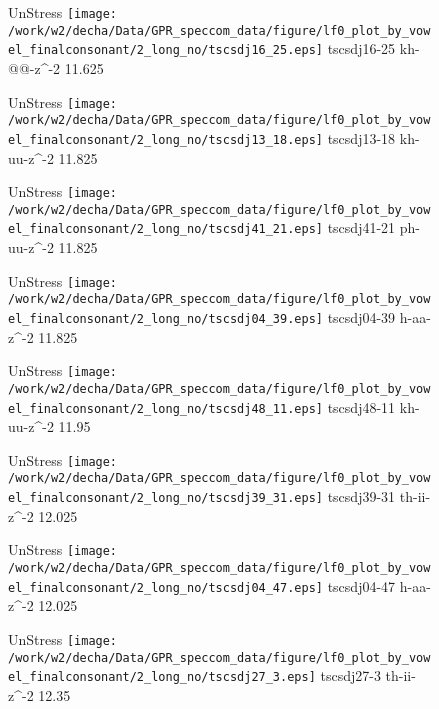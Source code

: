\documentclass{article}
\begin{document}
\begin{figure}[t]
\begin{minipage}[b]{.24\textwidth}
UnStress
\centering
\texttt{[image: /work/w2/decha/Data/GPR\_speccom\_data/figure/lf0\_plot\_by\_vowel\_finalconsonant/2\_long\_no/tscsdj16\_25.eps]}
tscsdj16-25 kh-@@-z\textasciicircum-2 11.625
\end{minipage}
\begin{minipage}[b]{.24\textwidth}
UnStress
\centering
\texttt{[image: /work/w2/decha/Data/GPR\_speccom\_data/figure/lf0\_plot\_by\_vowel\_finalconsonant/2\_long\_no/tscsdj13\_18.eps]}
tscsdj13-18 kh-uu-z\textasciicircum-2 11.825
\end{minipage}
\begin{minipage}[b]{.24\textwidth}
UnStress
\centering
\texttt{[image: /work/w2/decha/Data/GPR\_speccom\_data/figure/lf0\_plot\_by\_vowel\_finalconsonant/2\_long\_no/tscsdj41\_21.eps]}
tscsdj41-21 ph-uu-z\textasciicircum-2 11.825
\end{minipage}
\begin{minipage}[b]{.24\textwidth}
UnStress
\centering
\texttt{[image: /work/w2/decha/Data/GPR\_speccom\_data/figure/lf0\_plot\_by\_vowel\_finalconsonant/2\_long\_no/tscsdj04\_39.eps]}
tscsdj04-39 h-aa-z\textasciicircum-2 11.825
\end{minipage}
\end{figure}
\clearpage
\begin{figure}[t]
\begin{minipage}[b]{.24\textwidth}
UnStress
\centering
\texttt{[image: /work/w2/decha/Data/GPR\_speccom\_data/figure/lf0\_plot\_by\_vowel\_finalconsonant/2\_long\_no/tscsdj48\_11.eps]}
tscsdj48-11 kh-uu-z\textasciicircum-2 11.95
\end{minipage}
\begin{minipage}[b]{.24\textwidth}
UnStress
\centering
\texttt{[image: /work/w2/decha/Data/GPR\_speccom\_data/figure/lf0\_plot\_by\_vowel\_finalconsonant/2\_long\_no/tscsdj39\_31.eps]}
tscsdj39-31 th-ii-z\textasciicircum-2 12.025
\end{minipage}
\begin{minipage}[b]{.24\textwidth}
UnStress
\centering
\texttt{[image: /work/w2/decha/Data/GPR\_speccom\_data/figure/lf0\_plot\_by\_vowel\_finalconsonant/2\_long\_no/tscsdj04\_47.eps]}
tscsdj04-47 h-aa-z\textasciicircum-2 12.025
\end{minipage}
\begin{minipage}[b]{.24\textwidth}
UnStress
\centering
\texttt{[image: /work/w2/decha/Data/GPR\_speccom\_data/figure/lf0\_plot\_by\_vowel\_finalconsonant/2\_long\_no/tscsdj27\_3.eps]}
tscsdj27-3 th-ii-z\textasciicircum-2 12.35
\end{minipage}
\end{figure}
\end{document}
